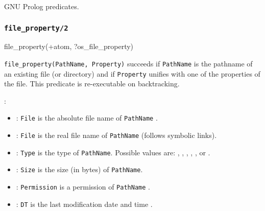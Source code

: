 \Portability

GNU Prolog predicates.

\subsubsection{\texttt{file\_property/2}}
\label{file-property/2}

\begin{TemplatesOneCol}
file\_property(+atom, ?os\_file\_property)

\end{TemplatesOneCol}

\Description

\texttt{file\_property(PathName, Property)} succeeds if \texttt{PathName} is
the pathname of an existing file (or directory) and if \texttt{Property}
unifies with one of the properties of the file. This predicate is
re-executable on backtracking.

:

\begin{itemize}

\item {}:
\texttt{File} is the absolute file name of \texttt{PathName}
.

\item {}: \texttt{File} is
the real file name of \texttt{PathName} (follows symbolic links).

\item {}: \texttt{Type} is the type of
  \texttt{PathName}. Possible values are: ,
  , , , 
,  or .

\item {}: \texttt{Size} is the size (in bytes) of
\texttt{PathName}.

\item {}: \texttt{Permission} is a
permission of \texttt{PathName} .

\item {}: \texttt{DT} is
the last modification date and time .

\end{itemize}

